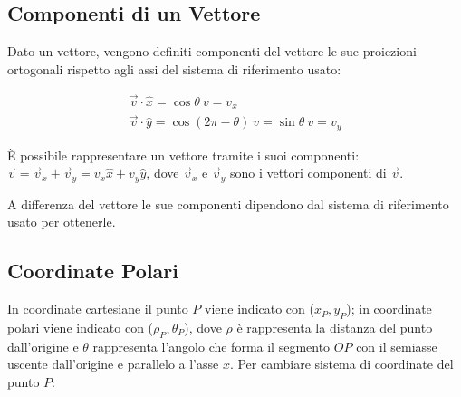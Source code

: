 \documentclass{article}
\numberwithin{equation}{subsection}
\begin{document}
\subsection{Componenti di un Vettore}
Dato un vettore, vengono definiti componenti del vettore le sue proiezioni ortogonali rispetto agli assi del sistema di riferimento usato:

\begin{gather}
    \vec{v}\cdot\hat{x} = \cos\theta\:v = v_x\\
    \vec{v}\cdot\hat{y} = \cos(2\pi - \theta)\:v = \sin\theta\:v = v_y
\end{gather}

\`{E} possibile rappresentare un vettore tramite i suoi componenti: $\vec{v} = \vec{v}_x + \vec{v}_y = v_x\hat{x} + v_y\hat{y}$, dove $\vec{v}_x$ e $\vec{v}_y$ sono i vettori componenti di $\vec{v}$.

\begin{center}\end{center}

A differenza del vettore le sue componenti dipendono dal sistema di riferimento usato per ottenerle.

\subsection{Coordinate Polari}
In coordinate cartesiane il punto $P$ viene indicato con ($x_P, y_P$); in coordinate polari viene indicato con ($\rho_P, \theta_P$), dove 
$\rho$ è rappresenta la distanza del punto dall'origine e $\theta$ rappresenta l'angolo che forma il segmento $OP$ con il semiasse uscente dall'origine e parallelo a l'asse $x$.
Per cambiare sistema di coordinate del punto $P$: 
\end{document}
